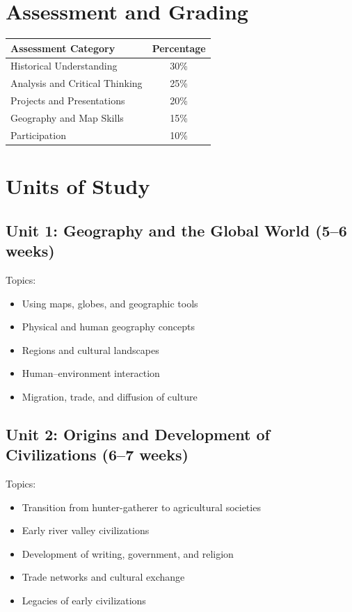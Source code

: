 \documentclass[11pt,letterpaper]{report}
\begin{document}
\section{Assessment and Grading}

\begin{center}
\begin{tabular}{|l|c|}
\hline
\textbf{Assessment Category} & \textbf{Percentage} \\
\hline
Historical Understanding & 30\% \\
\hline
Analysis and Critical Thinking & 25\% \\
\hline
Projects and Presentations & 20\% \\
\hline
Geography and Map Skills & 15\% \\
\hline
Participation & 10\% \\
\hline
\end{tabular}
\end{center}

\section{Units of Study}

\subsection{Unit 1: Geography and the Global World (5–6 weeks)}

Topics:
\begin{itemize}
\item Using maps, globes, and geographic tools
\item Physical and human geography concepts
\item Regions and cultural landscapes
\item Human–environment interaction
\item Migration, trade, and diffusion of culture
\end{itemize}

\subsection{Unit 2: Origins and Development of Civilizations (6–7 weeks)}

Topics:
\begin{itemize}
\item Transition from hunter-gatherer to agricultural societies
\item Early river valley civilizations
\item Development of writing, government, and religion
\item Trade networks and cultural exchange
\item Legacies of early civilizations
\end{itemize}
\end{document}
